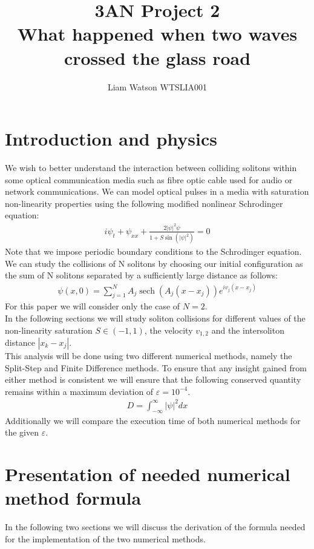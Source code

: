 \documentclass{article}
\title{3AN Project 2\\ What happened when two waves crossed the glass road}
\author{Liam Watson WTSLIA001}
\DeclareMathOperator{\sech}{sech}
\begin{document}
\maketitle
\section{Introduction and physics}
We wish to better understand the interaction between colliding solitons within some optical communication media such as fibre optic cable used for audio or network communications. 
We can model optical pulses in a media with saturation non-linearity properties using the following modified nonlinear  Schrodinger equation:
\begin{align}
i\psi_t + \psi_{xx} + \frac{2|\psi|^2\psi}{1+S\sin(|\psi|^2)} = 0
\end{align}
Note that we impose periodic boundary conditions to the Schrodinger equation. \\
We can study the collisions of N solitons by choosing our initial configuration as the sum of N solitons separated by a sufficiently large distance as follows:
\begin{align}
\psi (x,0) = \sum_{j=1}^N A_j \sech(A_j (x-x_j))e^{iv_j(x-x_j)}
\end{align}
For this paper we will consider only the case of $N=2$.\\
In the following sections we will study soliton collisions for different values of the non-linearity saturation $S\in(-1,1)$, the velocity $v_{1,2}$ and the intersoliton distance $|x_k-x_j|$. \\
This analysis will be done using two different numerical methods, namely the Split-Step and Finite Difference methods. To ensure that any insight gained from either method is consistent we will ensure that the following conserved quantity remains within a maximum deviation of $\varepsilon = 10^{-4}$.
\begin{align}
D = \int_{-\infty}^\infty |\psi|^2 dx
\end{align}
Additionally we will compare the execution time of both numerical methods for the given $\varepsilon$.
\section{Presentation of needed numerical method formula}
In the following two sections we will discuss the derivation of the formula needed for the implementation of the two numerical methods. 
\end{document}
